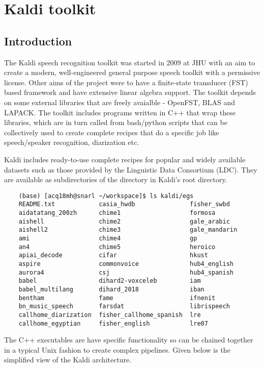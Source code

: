 \section{Kaldi toolkit}
	\subsection{Introduction}
	The Kaldi speech recognition toolkit was started in 2009 at JHU with an aim to create a modern, well-engineered general purpose speech toolkit with a permissive license. Other aims of the project were to have a finite-state transducer (FST) based framework and have extensive linear algebra support. The toolkit depends on some external libraries that are freely avaialble - OpenFST, BLAS and LAPACK. The toolkit includes programs written in C++ that wrap these libraries, which are in turn called from bash/python scripts that can be collectively used to create complete recipes that do a specific job like speech/speaker recognition, diarization etc.
	
	Kaldi includes ready-to-use complete recipes for popular and widely available datasets such as those provided by the Linguistic Data Consortium (LDC). They are available as subdirectories of the  directory in Kaldi's root directory.
	
	\begin{verbatim}
	(base) [acq18mh@snarl ~/workspace]$ ls kaldi/egs
	README.txt            casia_hwdb               fisher_swbd
	aidatatang_200zh      chime1                   formosa
	aishell               chime2                   gale_arabic
	aishell2              chime3                   gale_mandarin
	ami                   chime4                   gp
	an4                   chime5                   heroico
	apiai_decode          cifar                    hkust
	aspire                commonvoice              hub4_english
	aurora4               csj                      hub4_spanish
	babel                 dihard2-voxceleb         iam
	babel_multilang       dihard_2018              iban
	bentham               fame                     ifnenit
	bn_music_speech       farsdat                  librispeech
	callhome_diarization  fisher_callhome_spanish  lre
	callhome_egyptian     fisher_english           lre07
	\end{verbatim}
	
	The C++ executables are have specific functionality so can be chained together in a typical Unix fashion to create complex pipelines. Given below is the simplified view of the Kaldi architecture.
	
